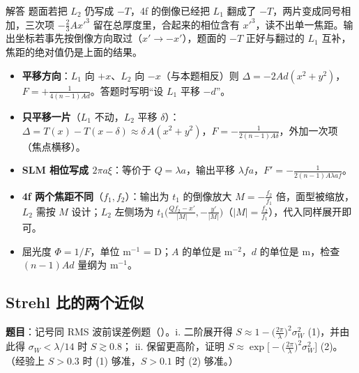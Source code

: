 \begin{exam}{解答}
题面若把 $L_2$ 仍写成 $-T$，4f 的倒像已经把 $L_1$ 翻成了 $-T$，两片变成同号相加，三次项 $-\frac23 A x'^3$ 留在总厚度里，合起来的相位含有 $x'^3$，读不出单一焦距。输出坐标若事先按倒像方向取过（$x'\to-x'$），题面的 $-T$ 正好与翻过的 $L_1$ 互补，焦距的绝对值仍是上面的结果。
\end{exam}

\begin{warn}[变式与易错]
\begin{itemize}
\item \textbf{平移方向}：$L_1$ 向 $+x$、$L_2$ 向 $-x$（与本题相反）则 $\Delta=-2Ad(x^2+y^2)$，$F=+\frac{1}{4(n-1)Ad}$。答题时写明“设 $L_1$ 平移 $-d$”。
\item \textbf{只平移一片}（$L_1$ 不动，$L_2$ 平移 $\delta$）：$\Delta=T(x)-T(x-\delta)\approx\delta\,A(x^2+y^2)$，$F=-\frac{1}{2(n-1)A\delta}$，外加一次项（焦点横移）。
\item \textbf{SLM 相位写成 $2\pi a\xi$}：等价于 $Q=\lambda a$，输出平移 $\lambda fa$，$F'=-\frac{1}{2(n-1)A\lambda af}$。
\item \textbf{4f 两个焦距不同}（$f_1,f_2$）：输出为 $t_1$ 的倒像放大 $M=-\frac{f_2}{f_1}$ 倍，面型被缩放，$L_2$ 需按 $M$ 设计；$L_2$ 左侧场为 $t_1\big(\frac{Qf_2-x'}{|M|},-\frac{y'}{|M|}\big)$（$|M|=\frac{f_2}{f_1}$），代入同样展开即可。
\item 屈光度 $\Phi=1/F$，单位 m$^{-1}$ = D；$A$ 的单位是 m$^{-2}$，$d$ 的单位是 m，检查 $(n-1)Ad$ 量纲为 m$^{-1}$。
\end{itemize}
\end{warn}

\subsection{Strehl 比的两个近似}\label{ex:v-strehl2}
\noindent\textbf{题目}：记号同 RMS 波前误差例题（\pageref{ex:v-strehl}）。i. 二阶展开得 $S\approx1-\big(\frac{2\pi}{\lambda}\big)^2\sigma_W^2$ (1)，并由此得 $\sigma_W<\lambda/14$ 时 $S\gtrsim0.8$；
ii. 保留更高阶，证明 $S\approx\exp\big[-\big(\frac{2\pi}{\lambda}\big)^2\sigma_W^2\big]$ (2)。（经验上 $S>0.3$ 时 (1) 够准，$S>0.1$ 时 (2) 够准。）

